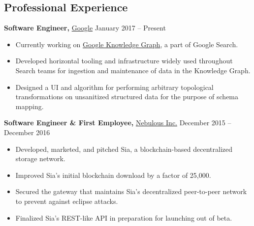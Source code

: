 \documentclass[margin]{res}
\begin{document}
\begin{minipage}{\textwidth}


\begin{resume}

\section{Professional Experience}
{\bf Software Engineer,} \uline{Google} \hfill January 2017 -- Present
 \begin{itemize} \itemsep -2pt %
 \item Currently working on \uline{\href{https://blog.google/products/search/introducing-knowledge-graph-things-not/}{Google Knowledge Graph}}, a part of Google Search.
 \item Developed horizontal tooling and infrastructure widely used throughout Search teams for ingestion and maintenance of data in the Knowledge Graph.
 \item Designed a UI and algorithm for performing arbitrary topological transformations on unsanitized structured data for the purpose of schema mapping.
 \end{itemize}



{\bf Software Engineer \& First Employee,} \uline{Nebulous Inc.} \hfill December 2015 -- December 2016
 \begin{itemize} \itemsep -2pt %
 \item Developed, marketed, and pitched Sia, a blockchain-based decentralized storage network.
 \item Improved Sia's initial blockchain download by a factor of 25,000.
 \item Secured the gateway that maintains Sia's decentralized peer-to-peer network to prevent against eclipse attacks.
 \item Finalized Sia's REST-like API in preparation for launching out of beta.
 \end{itemize}




\end{resume}
\end{minipage}
\end{document}
